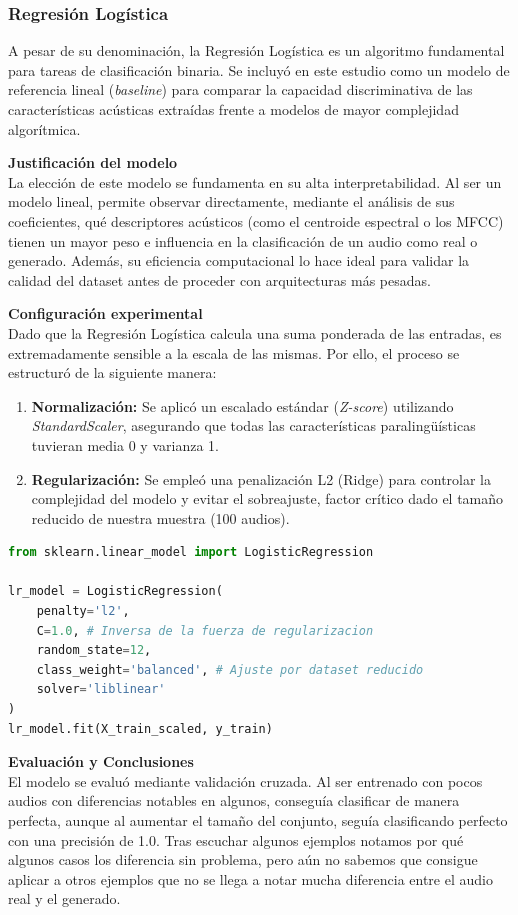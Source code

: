 \subsubsection{Regresión Logística}

A pesar de su denominación, la Regresión Logística es un algoritmo fundamental para tareas de clasificación binaria. Se incluyó en este estudio como un modelo de referencia lineal (\textit{baseline}) para comparar la capacidad discriminativa de las características acústicas extraídas frente a modelos de mayor complejidad algorítmica.

\textbf{Justificación del modelo} \\
La elección de este modelo se fundamenta en su alta interpretabilidad. Al ser un modelo lineal, permite observar directamente, mediante el análisis de sus coeficientes, qué descriptores acústicos (como el centroide espectral o los MFCC) tienen un mayor peso e influencia en la clasificación de un audio como real o generado. Además, su eficiencia computacional lo hace ideal para validar la calidad del dataset antes de proceder con arquitecturas más pesadas.

\textbf{Configuración experimental} \\
Dado que la Regresión Logística calcula una suma ponderada de las entradas, es extremadamente sensible a la escala de las mismas. Por ello, el proceso se estructuró de la siguiente manera:

\begin{enumerate}
    \item \textbf{Normalización:} Se aplicó un escalado estándar (\textit{Z-score}) utilizando \textit{StandardScaler}, asegurando que todas las características paralingüísticas tuvieran media 0 y varianza 1.
    \item \textbf{Regularización:} Se empleó una penalización L2 (Ridge) para controlar la complejidad del modelo y evitar el sobreajuste, factor crítico dado el tamaño reducido de nuestra muestra (100 audios).
\end{enumerate}

\begin{lstlisting}[language=Python, caption={Configuración de Regresión Logística}]
from sklearn.linear_model import LogisticRegression

lr_model = LogisticRegression(
    penalty='l2',
    C=1.0, # Inversa de la fuerza de regularizacion
    random_state=12,
    class_weight='balanced', # Ajuste por dataset reducido
    solver='liblinear'
)
lr_model.fit(X_train_scaled, y_train)
\end{lstlisting}

\textbf{Evaluación y Conclusiones} \\
El modelo se evaluó mediante validación cruzada. Al ser entrenado con pocos audios con diferencias notables en algunos, conseguía clasificar de manera perfecta, aunque al aumentar el tamaño del conjunto, seguía clasificando perfecto con una precisión de 1.0. Tras escuchar algunos ejemplos notamos por qué algunos casos los diferencia sin problema, pero aún no sabemos que consigue aplicar a otros ejemplos que no se llega a notar mucha diferencia entre el audio real y el generado.